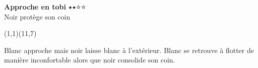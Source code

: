 \documentclass[preview, border=0pt, varwidth=false]{standalone}
\begin{document}
	\setgounit{0.6cm} 
	
\parbox[c][14.65cm][c]{10.2cm}{
	\centering
	
	{\Large\textbf{Approche en tobi} 	$\medblackstar \medblackstar \medwhitestar \medwhitestar$ \\ Noir protège son coin}
	\vspace{3em}
	
	\begin{psgopartialboard}{(1,1)(11,7)}
		\pass
	\end{psgopartialboard}
	
	\vspace{1em}
	Blanc approche mais noir laisse blanc à l'extérieur. Blanc se retrouve à flotter de manière inconfortable alors que noir consolide son coin.}
\end{document}
